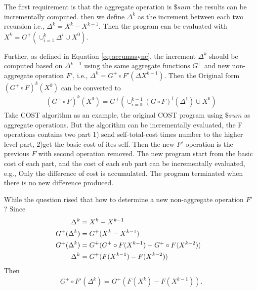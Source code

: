 {\color{red}

The first requirement is that{\color{blue} the aggregate operation is $\$sum$ } the results can be incrementally computed. then we define $\Delta^{k}$ as the increment between each two recursion i.e., $\Delta^{k}=X^k-X^{k-1}$. Then the program can be evaluated with $X^k=G^+(\cup_{i=1}^{k}\Delta^i\cup X^0)$.

Further, as defined in Equation \ref{eq:accumasync}, the increment $\Delta^{k}$ should be computed based on $\Delta^{k-1}$ using the same aggregate functions $G^+$ and new non-aggregate operation $F'$, i.e., $\Delta^{k}=G^+\circ F'(\Delta X^{k-1})$.
Then the Original form $(G^+\circ F)^k(X^0)$ can be converted to
\begin{equation}
\label{eq:convertform}
\begin{aligned}
&(G^+\circ F)^k(X^0)
=G^+( \cup_{i=0}^{k-1}{(G\circ F)^i(\Delta^{1})\cup X^0})
\end{aligned}
\end{equation}
Take COST algorithm as an example, the original COST program using $\$sum$ as aggregate operations. But the algorithm can be incrementally evaluated, the F operations contains two part 1) send self-total-cost times number to the higher level part, 2)get the basic cost of ites self.  Then the new $F'$ operation is the previous $F$ with second operation removed. The new program start from the basic cost of each part, and the cost of each sub part can be incrementally evaluated, e.g., Only the difference of cost is accumulated. The program terminated when there is no new difference produced.

While the question rised that how to determine a new non-aggregate operation $F'$? Since
\begin{equation}
\label{eq:inferr}
\begin{aligned}
\Delta^k&=X^k-X^{k-1}\\
G^+(\Delta^{k})&=G^+(X^k-X^{k-1})\\
G^+(\Delta^{k})&=G^+(G^+\circ F(X^{k-1})-G^+\circ F(X^{k-2}))\\
\Delta^{k}&=G^+(F(X^{k-1})-F(X^{k-2}))\notag
\end{aligned}
\end{equation}
Then
\begin{equation}
\label{eq:findf}
\begin{aligned}
&G^+\circ F'(\Delta^{k})=G^+(F(X^{k})-F(X^{k-1})).
\end{aligned}
\end{equation}
}

